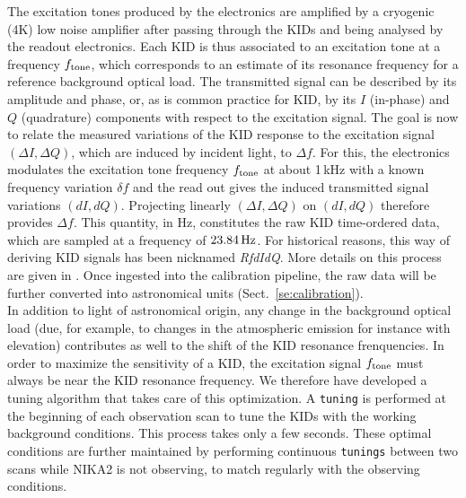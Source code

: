 The excitation tones produced by the electronics are amplified by a
cryogenic (4K) low noise amplifier after passing through the KIDs and
being analysed by the readout electronics. {\lp Each KID is thus
associated to an excitation tone at a frequency $f_{\rm{tone}}$, which
corresponds to an estimate of its resonance frequency for a reference
background optical load.}
The transmitted signal can be described by its
amplitude and phase, or, as is common practice for KID, by its $I$
(in-phase) and $Q$ (quadrature) components
with respect to the excitation signal.
The goal is now to relate the measured variations of the KID response
to the excitation signal $(\Delta I, \Delta Q)$, which are induced by incident light, to
$\Delta f$. For this, the electronics modulates the excitation tone
frequency $f_{\rm{tone}}$ at about 1\,kHz with a known frequency variation $\delta f$
and the read out gives the induced transmitted signal variations
$(dI, dQ)$. Projecting linearly $(\Delta I, \Delta Q)$ on $(dI, dQ)$ therefore
provides $\Delta f$. This quantity, in Hz, constitutes the raw KID
time-ordered data, which are sampled at a frequency of
$23.84\,\rm{Hz}$. For historical reasons, this way of deriving KID
signals has been nicknamed \emph{RfdIdQ}. More details on this process
are given in \citet{Calvo2013}.
Once ingested into the calibration pipeline, the raw data will be further converted
into astronomical units (Sect.~\ref{se:calibration}).\\


In addition to light of astronomical origin, any change in the
background optical load (due, for example, to changes in
the atmospheric emission for instance with elevation) contributes as well to
the shift of the KID resonance frenquencies. In
order to maximize the sensitivity of a KID, the excitation signal $f_{\rm{tone}}$
must always be near the KID resonance frequency. We therefore have
developed a tuning algorithm that takes care of
this optimization. A {\tt tuning} is performed at the beginning
of each observation scan to tune the KIDs with the working background
conditions.
This process takes only a few seconds.
These optimal conditions are further maintained by performing
continuous {\tt tunings} between two scans while NIKA2 is not observing, to
match regularly with the observing conditions.

